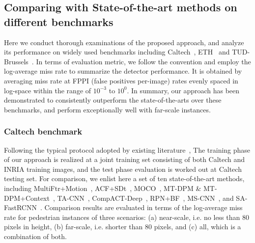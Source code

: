 \documentclass[10pt,journal,compsoc,twoside]{IEEEtran}
\begin{document}
\subsection{Comparing with State-of-the-art methods on different benchmarks}
Here we conduct thorough examinations of the proposed approach,
and analyze its performance on widely used benchmarks including Caltech~\cite{DolEtAl:cvpr09}, ETH~\cite{DolEtAl:bmvc10} and TUD-Brussels~\cite{WojWalSch:cvpr09}.
In terms of evaluation metric, we follow the convention and employ the log-average miss rate to summarize the detector performance.
It is obtained by averaging miss rate at FPPI (false positives per-image) rates evenly spaced in log-space within the range of $10^{-3}$ to $10^0$.
In summary, our approach has been demonstrated to consistently outperform the state-of-the-arts over these benchmarks, and perform exceptionally well with far-scale instances.


\subsubsection{Caltech benchmark}
Following the typical protocol adopted by existing literature~\cite{RedEtAl:cvpr16,TiaEtAl:iccv15,YanEtAl:cvpr14,CaiSabVas:iccv15,ZhaBenSch:cvpr15,HosEtAl:cvpr15},
The training phase of our approach is realized at a joint training set consisting of both Caltech and INRIA training images,
and the test phase evaluation is worked out at Caltech testing set.
For comparison, we enlist here a set of ten state-of-the-art methods, including MultiFtr+Motion~\cite{WalEtAl:cvpr10}, ACF+SDt~\cite{ParEtAl:cvpr13},
MOCO~\cite{CheEtAl:cvpr13}, MT-DPM \& MT-DPM+Context~\cite{YanEtAl:cvpr14}, TA-CNN~\cite{TiaEtAl:cvpr15}, CompACT-Deep~\cite{CaiSabVas:iccv15}, RPN+BF~\cite{ZhaEtAl:eccv16}, MS-CNN~\cite{CaiEtAl:eccv16}, and SA-FastRCNN~\cite{LiEtAl:cvpr15}.
%
Comparison results are evaluated in terms of the log-average miss rate for pedestrian instances of three scenarios:
(a) near-scale, i.e. no less than 80 pixels in height, (b) far-scale, i.e. shorter than 80 pixels, and (c) all, which is a combination of both.
\end{document}
